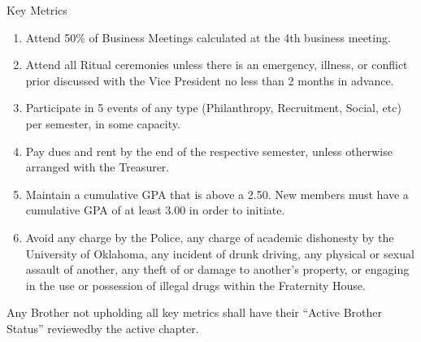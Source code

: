 \documentclass{article}
\begin{document}
Key Metrics

\begin{enumerate}
    \item Attend 50\% of Business Meetings calculated at the 4th business meeting.
    \item Attend all Ritual ceremonies unless there is an emergency, illness, or conflict prior discussed with the Vice President no less than 2 months in advance.
    \item Participate in 5 events of any type (Philanthropy, Recruitment, Social, etc) per semester, in some capacity.
    \item Pay dues and rent by the end of the respective semester, unless otherwise arranged with the Treasurer.
    \item Maintain a cumulative GPA that is above a 2.50. New members must have a cumulative GPA of at least 3.00 in order to initiate.
    \item Avoid any charge by the Police, any charge of academic dishonesty by the University of Oklahoma, any incident of drunk driving, any physical or sexual assault of another, any theft of or damage to another’s property, or engaging in the use or possession of illegal drugs within the Fraternity House.
\end{enumerate}

Any Brother not upholding all key metrics shall have their “Active Brother Status” reviewed\footnotemark by the active chapter.

\end{document}
